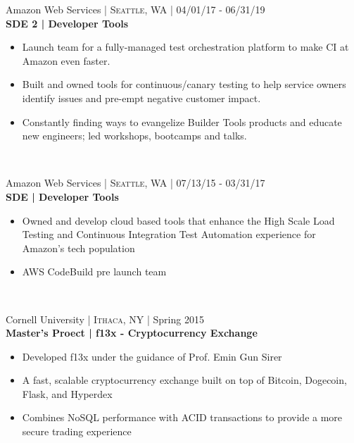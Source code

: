 \documentclass[10pt]{article} %
\begin{document}
{\begin{minipage}[t]{0.57\textwidth}
{\raggedright\large Amazon Web Services \normalsize\textsc{ | Seattle, WA} | 04/01/17 - 06/31/19\\
\textbf{SDE 2 | Developer Tools}\\[5pt]}
\vspace{0pt}
\begin{itemize}\itemsep-0.25em
    \item Launch team for a fully-managed test orchestration platform to make CI at Amazon even faster.
    \item Built and owned tools for continuous/canary testing to help service owners identify issues and pre-empt negative customer impact.
    \item Constantly finding ways to evangelize Builder Tools products and educate new engineers; led workshops, bootcamps and talks.
\end{itemize}\\

{\raggedright\large Amazon Web Services \normalsize\textsc{ | Seattle, WA} | 07/13/15 - 03/31/17\\
\textbf{SDE | Developer Tools}\\[5pt]}
\vspace{0pt}
\begin{itemize}\itemsep-0.25em
    \item Owned and develop cloud based tools that enhance the High Scale Load Testing and Continuous Integration Test Automation experience for Amazon's tech population
    \item AWS CodeBuild pre launch team
\end{itemize}\\

{\raggedright\large Cornell University \normalsize\textsc{ | Ithaca, NY} | Spring 2015\\
\textbf{Master's Proect | f13x - Cryptocurrency Exchange }\\[5pt]}
\begin{itemize}\itemsep-0.25em
    \item Developed f13x under the guidance of Prof. Emin Gun Sirer
    \item A fast, scalable cryptocurrency exchange built on top of Bitcoin, Dogecoin, Flask, and Hyperdex
    \item Combines NoSQL performance with ACID transactions to provide a more secure trading experience
\end{itemize}\\



\end{minipage}}
\end{document}
